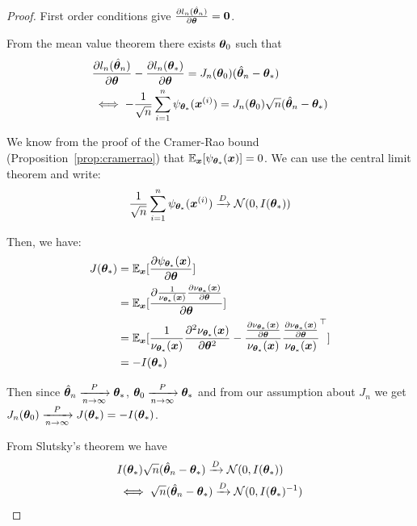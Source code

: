 \begin{proof}

  First order conditions give $\partialfrac{\thetab}{l_n(\hat{\thetab}_n)} = \bzero$.

  From the mean value theorem there exists $\thetab_0$ such that
  \begin{align}
    &\partialfrac{\thetab}{l_n(\hat{\thetab}_n)} - \partialfrac{\thetab}{l_n(\thetab_*)} = J_n(\thetab_0)(\hat{\thetab}_n - \thetab_*) \\
    &\iff -\frac1{\sqrt{n}} \sum_{i=1}^n  \psi_{\thetab_*}(\xb^{(i)}) = J_n(\thetab_0)\sqrt{n}(\hat{\thetab}_n - \thetab_*)
  \end{align}

  We know from the proof of the Cramer-Rao bound
  (Proposition~\ref{prop:cramerrao}) that $\EE_{\xb} [\psi_{\thetab_*}(\xb)]=
  0$.  We can use the central limit theorem and write:
  \begin{align}
  \frac1{\sqrt{n}} \sum_{i=1}^n  \psi_{\thetab_*}(\xb^{(i)}) \xrightarrow[]{D}
  \Ncal(0, I(\thetab_*))
  \end{align}

  Then, we have:
  \begin{align}
  J(\thetab_*) &= \EE_{\xb}[\partialfrac{\thetab}{\psi_{\thetab_*}(\xb)}] \\
              &=  \EE_{\xb} [\partialfrac{\thetab}{ \frac1{\nu_{\thetab_*}(\xb)} \partialfrac{\thetab}{ \nu_{\thetab_*}(\xb)}} ] \\
              &= \EE_{\xb}[\frac1{\nu_{\thetab_*}(\xb)} \partialfrac{\thetab^2}{^2 \nu_{\thetab_*}(\xb)}-\frac{\partialfrac{\thetab}{ \nu_{\thetab_*}(\xb)}}{\nu_{\thetab_*}(\xb)}   \frac{\partialfrac{\thetab}{\nu_{\thetab_*}(\xb)}}{\nu_{\thetab_*}(\xb)}^{\top}  ] \\
              &= - I(\thetab_*) \\
  \end{align}

  Then since $\hat{\thetab}_n \xrightarrow[n \rightarrow \infty]{P} \thetab_*$, $\thetab_0
  \xrightarrow[n \rightarrow \infty]{P} \thetab_*$ and from our assumption about
  $J_n$ we get
  $J_n(\thetab_0) \xrightarrow[n \rightarrow \infty]{P} J(\thetab_*) =
  -I(\thetab_*)$.

  From Slutsky's theorem we have
  \begin{align}
    &I(\thetab_*) \sqrt{n}(\hat{\thetab}_n - \thetab_*) \xrightarrow[]{D}\Ncal(0, I(\thetab_*)) \\
    &\iff \sqrt{n}(\hat{\thetab}_n - \thetab_*) \xrightarrow[]{D}\Ncal(0, I(\thetab_*)^{-1})
  \end{align}
\end{proof}

